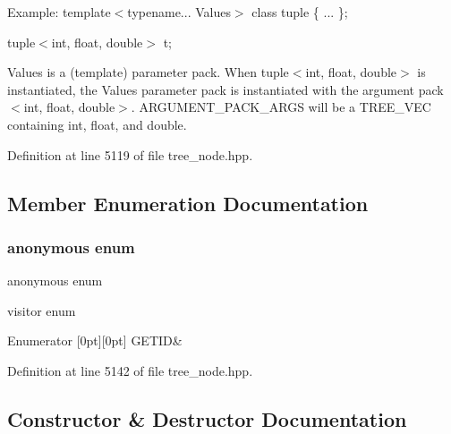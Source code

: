 Example\+: template$<$typename... Values$>$ class tuple \{ ... \};

tuple$<$int, float, double$>$ t;

Values is a (template) parameter pack. When tuple$<$int, float, double$>$ is instantiated, the Values parameter pack is instantiated with the argument pack $<$int, float, double$>$. A\+R\+G\+U\+M\+E\+N\+T\+\_\+\+P\+A\+C\+K\+\_\+\+A\+R\+GS will be a T\+R\+E\+E\+\_\+\+V\+EC containing int, float, and double. 

Definition at line 5119 of file tree\+\_\+node.\+hpp.



\subsection{Member Enumeration Documentation}
\mbox{\label{structtype__argument__pack_a590c7bd660db11f7d64f0f57d0e046d0}} 
\subsubsection{\texorpdfstring{anonymous enum}{anonymous enum}}
{\footnotesize\ttfamily anonymous enum}



visitor enum 

\begin{DoxyEnumFields}{Enumerator}
[0pt][0pt]{}\mbox{\label{structtype__argument__pack_a590c7bd660db11f7d64f0f57d0e046d0a21df64dfcd09c310c16ff5980cd66e2c}} 
G\+E\+T\+ID&\\
\hline

\end{DoxyEnumFields}


Definition at line 5142 of file tree\+\_\+node.\+hpp.



\subsection{Constructor \& Destructor Documentation}
\mbox{\label{structtype__argument__pack_a6fbc1b834a7fac561f6ee3c60724d98d}} 
